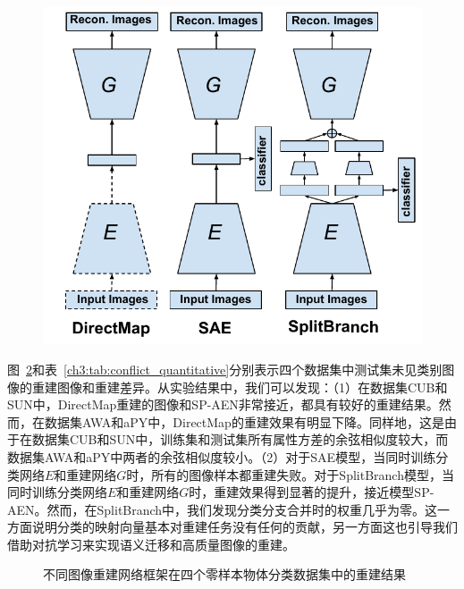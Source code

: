 \begin{figure}
    \centering
        \includegraphics[width=0.95\linewidth]{chapter3/res/conflict.pdf}
    \label{ch3:fig:conflict}
\end{figure}

图~\ref{ch3:fig:conflict_visualization}和表~\ref{ch3:tab:conflict_quantitative}分别表示四个数据集中测试集未见类别图像的重建图像和重建差异。从实验结果中，我们可以发现：（1）在数据集CUB和SUN中，DirectMap重建的图像和SP-AEN非常接近，都具有较好的重建结果。然而，在数据集AWA和aPY中，DirectMap的重建效果有明显下降。同样地，这是由于在数据集CUB和SUN中，训练集和测试集所有属性方差的余弦相似度较大，而数据集AWA和aPY中两者的余弦相似度较小。（2）对于SAE模型，当同时训练分类网络$E$和重建网络$G$时，所有的图像样本都重建失败。对于SplitBranch模型，当同时训练分类网络$E$和重建网络$G$时，重建效果得到显著的提升，接近模型SP-AEN。然而，在SplitBranch中，我们发现分类分支合并时的权重几乎为零。这一方面说明分类的映射向量基本对重建任务没有任何的贡献，另一方面这也引导我们借助对抗学习来实现语义迁移和高质量图像的重建。

\begin{figure}[t]
    \centering
    \caption{不同图像重建网络框架在四个零样本物体分类数据集中的重建结果}
    \label{ch3:fig:conflict_visualization}
\end{figure}


